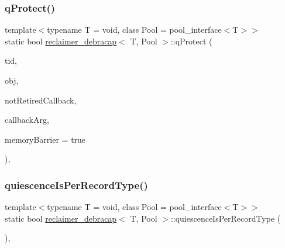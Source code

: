 \subsubsection{\texorpdfstring{q\+Protect()}{qProtect()}}
{\footnotesize\ttfamily template$<$typename T  = void, class Pool  = pool\+\_\+interface$<$\+T$>$$>$ \\
static bool \hyperlink{classreclaimer__debracap}{reclaimer\+\_\+debracap}$<$ T, Pool $>$\+::q\+Protect (\begin{DoxyParamCaption}\item[{const int}]{tid,  }\item[{T $\ast$const}]{obj,  }\item[{\hyperlink{globals_8h_a57f5c0d40b156d7d996492fb2f16e3cd}{Callback\+Type}}]{not\+Retired\+Callback,  }\item[{\hyperlink{globals_8h_a3de64ef48066ac6430631c8b81a15345}{Callback\+Arg}}]{callback\+Arg,  }\item[{bool}]{memory\+Barrier = {\ttfamily true} }\end{DoxyParamCaption})\hspace{0.3cm}{\ttfamily [inline]}, {\ttfamily [static]}}

\mbox{\label{classreclaimer__debracap_a1b4f8e3613dfeb9721395d3bdd4a3415}} 
\subsubsection{\texorpdfstring{quiescence\+Is\+Per\+Record\+Type()}{quiescenceIsPerRecordType()}}
{\footnotesize\ttfamily template$<$typename T  = void, class Pool  = pool\+\_\+interface$<$\+T$>$$>$ \\
static bool \hyperlink{classreclaimer__debracap}{reclaimer\+\_\+debracap}$<$ T, Pool $>$\+::quiescence\+Is\+Per\+Record\+Type (\begin{DoxyParamCaption}{ }\end{DoxyParamCaption})\hspace{0.3cm}{\ttfamily [inline]}, {\ttfamily [static]}}

\mbox{\label{classreclaimer__debracap_a479f0c88f9895fef9d15e6ffb1a41ea4}} 

